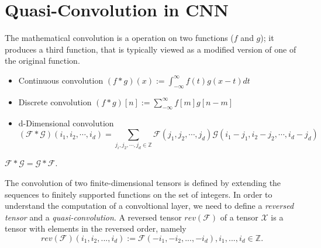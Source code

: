 \section{Quasi-Convolution in CNN}
The mathematical convolution is a operation on two functions ($f$ and $g$); it produces a third function, that is typically viewed as a modified version of one of the original function.

\begin{itemize}
\item
Continuous convolution
$(f*g)(x) := \int_{-\infty}^{\infty}f(t)g(x-t)dt$
\item
Discrete convolution
$(f*g)[n] := \sum_{-\infty}^\infty f[m]g[n-m]$
\item 
d-Dimensional convolution
$$(\mathcal{F}\ast \mathcal{G})(i_1, i_2, \cdots ,i_d) = \sum_{j_i, j_2,\cdots,j_d \in \mathbb{Z}} \mathcal{F}(j_1, j_2,\cdots,j_d)\mathcal{G}(i_1 - j_1, i_2 - j_2, \cdots, i_d - j_d)$$
\end{itemize}

\begin{lemma}\label{lconv}
$\mathcal{F}\ast \mathcal{G} = \mathcal{G}\ast \mathcal{F}$.
\end{lemma}

The convolution of two finite-dimensional tensors is defined by extending the sequences to finitely supported functions on the set of integers. In order to understand the computation of a convoltional layer, we need to define a \textit{reversed tensor} and a \textit{quasi-convolution}. A reversed tensor $rev(\mathcal{F})$ of a tensor $\mathcal{X}$ is a tensor with elements in the reversed order, namely
\begin{equation}\label{erevt}
rev(\mathcal{F})(i_1,i_2,...,i_d) := \mathcal{F}(-i_1,-i_2,...,-i_d), i_1,...,i_d\in\mathbb{Z}.
\end{equation}


